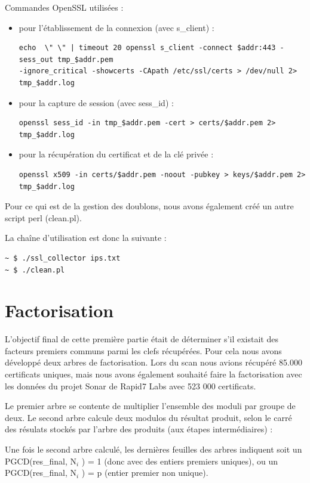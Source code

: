 \documentclass[a4paper,11pt,french]{article}
\begin{document}
Commandes OpenSSL utilisées :
\begin{itemize}
\item pour l'établissement de la connexion (avec s\_client) :

\begin{verbatim}
echo  \" \" | timeout 20 openssl s_client -connect $addr:443 -sess_out tmp_$addr.pem 
-ignore_critical -showcerts -CApath /etc/ssl/certs > /dev/null 2> tmp_$addr.log
\end{verbatim}
\item  pour la capture de session (avec sess\_id) :
\begin{verbatim}
openssl sess_id -in tmp_$addr.pem -cert > certs/$addr.pem 2> tmp_$addr.log
\end{verbatim}
\item pour la récupération du certificat et de la clé privée :
\begin{verbatim}
openssl x509 -in certs/$addr.pem -noout -pubkey > keys/$addr.pem 2> tmp_$addr.log
\end{verbatim}
\end{itemize}

Pour ce qui est de la gestion des doublons, nous avons également créé un autre script perl (clean.pl).

La chaîne d'utilisation est donc la suivante :
\begin{verbatim}
~ $ ./ssl_collector ips.txt
~ $ ./clean.pl
\end{verbatim}

\section{Factorisation}

L'objectif final de cette première partie était de déterminer s'il existait des facteurs premiers communs
parmi les clefs récupérées. Pour cela nous avons développé deux arbres de factorisation.
Lors du scan nous avions récupéré 85.000 certificats uniques, mais nous avons également souhaité faire la factorisation avec les données du projet Sonar de Rapid7 Labs avec 523 000 certificats.

Le premier arbre se contente de multiplier l'ensemble des moduli par groupe de deux.
Le second arbre calcule deux modulos du résultat produit, selon le carré des résulats stockés par l'arbre des produits (aux étapes intermédiaires) :

Une fois le second arbre calculé, les dernières feuilles des arbres indiquent soit un PGCD(res\_final, N$_i$ ) = 1 (donc avec des entiers premiers uniques), ou un PGCD(res\_final, N$_i$ ) = p (entier premier non unique).
\end{document}
